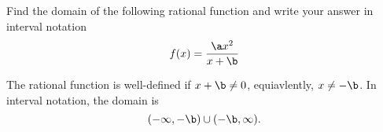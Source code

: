 






Find the domain of the following rational function and write your answer in interval notation
\[
  f(x)=\frac{\a x^2}{x+\b}
\]

\begin{solution}
The rational function is well-defined if $x+\b\neq 0$, equiavlently, $x\neq -\b$. In interval notation, the domain is 
\[(-\infty, -\b)\cup (-\b, \infty).\]
\end{solution}